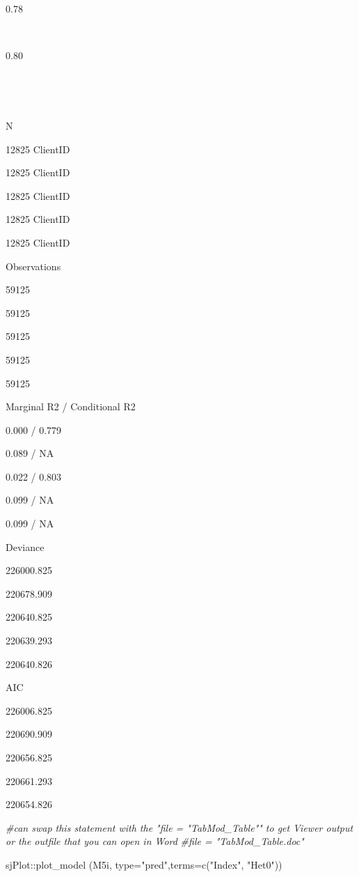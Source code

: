 \documentclass[
  english,
]{book}
\newenvironment{Shaded}{\begin{snugshade}}{\end{snugshade}}
\newcommand{\AttributeTok}[1]{\textcolor[rgb]{0.77,0.63,0.00}{#1}}
\newcommand{\CommentTok}[1]{\textcolor[rgb]{0.56,0.35,0.01}{\textit{#1}}}
\newcommand{\FunctionTok}[1]{\textcolor[rgb]{0.00,0.00,0.00}{#1}}
\newcommand{\NormalTok}[1]{#1}
\newcommand{\SpecialCharTok}[1]{\textcolor[rgb]{0.00,0.00,0.00}{#1}}
\newcommand{\StringTok}[1]{\textcolor[rgb]{0.31,0.60,0.02}{#1}}
\begin{document}
0.78

~

0.80

~

~

N

12825 ClientID

12825 ClientID

12825 ClientID

12825 ClientID

12825 ClientID

Observations

59125

59125

59125

59125

59125

Marginal R2 / Conditional R2

0.000 / 0.779

0.089 / NA

0.022 / 0.803

0.099 / NA

0.099 / NA

Deviance

226000.825

220678.909

220640.825

220639.293

220640.826

AIC

226006.825

220690.909

220656.825

220661.293

220654.826

\begin{Shaded}
\begin{Highlighting}[]
\CommentTok{\#can swap this statement with the "file = "TabMod\_Table"" to get Viewer output or the outfile that you can open in Word}
\CommentTok{\#file = "TabMod\_Table.doc"}
\end{Highlighting}
\end{Shaded}

\begin{Shaded}
\begin{Highlighting}[]
\NormalTok{sjPlot}\SpecialCharTok{::}\FunctionTok{plot\_model}\NormalTok{ (M5i, }\AttributeTok{type=}\StringTok{"pred"}\NormalTok{,}\AttributeTok{terms=}\FunctionTok{c}\NormalTok{(}\StringTok{"Index"}\NormalTok{, }\StringTok{"Het0"}\NormalTok{))}
\end{Highlighting}
\end{Shaded}
\end{document}
